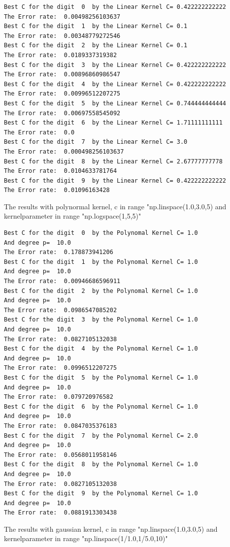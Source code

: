 \documentclass[a4paper,11pt]{article}
\begin{document}
\begin{verbatim}
Best C for the digit  0  by the Linear Kernel C= 0.422222222222
The Error rate:  0.00498256103637
Best C for the digit  1  by the Linear Kernel C= 0.1
The Error rate:  0.00348779272546
Best C for the digit  2  by the Linear Kernel C= 0.1
The Error rate:  0.0189337319382
Best C for the digit  3  by the Linear Kernel C= 0.422222222222
The Error rate:  0.00896860986547
Best C for the digit  4  by the Linear Kernel C= 0.422222222222
The Error rate:  0.00996512207275
Best C for the digit  5  by the Linear Kernel C= 0.744444444444
The Error rate:  0.00697558545092
Best C for the digit  6  by the Linear Kernel C= 1.71111111111
The Error rate:  0.0
Best C for the digit  7  by the Linear Kernel C= 3.0
The Error rate:  0.000498256103637
Best C for the digit  8  by the Linear Kernel C= 2.67777777778
The Error rate:  0.0104633781764
Best C for the digit  9  by the Linear Kernel C= 0.422222222222
The Error rate:  0.01096163428
\end{verbatim}


The results with polynormal kernel, c in range "np.linspace(1.0,3.0,5) and kernelparameter in range "np.logspace(1,5,5)"

\begin{verbatim}
Best C for the digit  0  by the Polynomal Kernel C= 1.0
And degree p=  10.0
The Error rate:  0.178873941206
Best C for the digit  1  by the Polynomal Kernel C= 1.0
And degree p=  10.0
The Error rate:  0.00946686596911
Best C for the digit  2  by the Polynomal Kernel C= 1.0
And degree p=  10.0
The Error rate:  0.0986547085202
Best C for the digit  3  by the Polynomal Kernel C= 1.0
And degree p=  10.0
The Error rate:  0.0827105132038
Best C for the digit  4  by the Polynomal Kernel C= 1.0
And degree p=  10.0
The Error rate:  0.0996512207275
Best C for the digit  5  by the Polynomal Kernel C= 1.0
And degree p=  10.0
The Error rate:  0.079720976582
Best C for the digit  6  by the Polynomal Kernel C= 1.0
And degree p=  10.0
The Error rate:  0.0847035376183
Best C for the digit  7  by the Polynomal Kernel C= 2.0
And degree p=  10.0
The Error rate:  0.0568011958146
Best C for the digit  8  by the Polynomal Kernel C= 1.0
And degree p=  10.0
The Error rate:  0.0827105132038
Best C for the digit  9  by the Polynomal Kernel C= 1.0
And degree p=  10.0
The Error rate:  0.0881913303438
\end{verbatim}

The results with gaussian kernel, c in range "np.linspace(1.0,3.0,5) and kernelparameter in range "np.linspace(1/1.0,1/5.0,10)"
\end{document}
